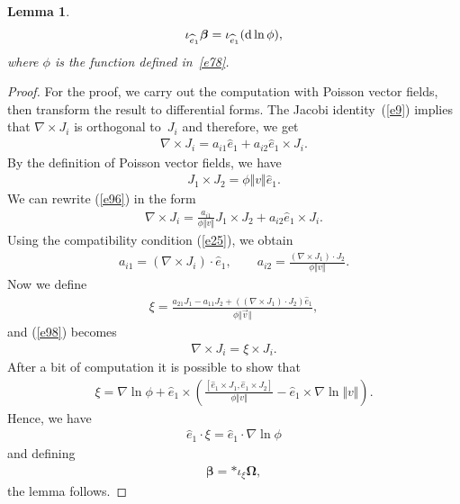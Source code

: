 \documentclass[pdftex]{sigma}
\numberwithin{equation}{section}
\newtheorem{Lemma}[Theorem]{Lemma}
\begin{document}
\begin{Lemma}\label{lemma2}
\begin{gather*}
\iota _{\widehat{e}_{1}}\boldsymbol{\beta }=\iota _{\widehat{e}_{1}} ( {\rm d}\ln \phi ),
\end{gather*}
where $\phi $ is the function defined in~\eqref{e78}.
\end{Lemma}

\begin{proof}
For the proof, we carry out the computation with Poisson vector f\/ields, then transform the result to dif\/ferential forms. The Jacobi identity~(\ref{e9}) implies that $\nabla \times J_{i}$ is orthogonal to~$J_{i}$ and therefore, we get
\begin{gather}
\nabla \times J_{i}=a_{i1}\widehat{e}_{1}+a_{i2}\widehat{e}_{1}\times J_{i}.\label{e96}
\end{gather}
By the def\/inition of Poisson vector f\/ields, we have
\begin{gather*}
J_{1}\times J_{2}=\phi \Vert v\Vert \widehat{e}_{1}.
\end{gather*}
We can rewrite (\ref{e96}) in the form
\begin{gather}
\nabla \times J_{i}=\frac{a_{i1}}{\phi \Vert v\Vert }J_{1}\times J_{2}+a_{i2}\widehat{e}_{1}\times J_{i}. \label{e98}
\end{gather}
Using the compatibility condition (\ref{e25}), we obtain
\begin{gather*}
a_{i1} = ( \nabla \times J_{i}) \cdot \widehat{e}_{1}, \qquad
a_{i2} = \frac{( \nabla \times J_{1}) \cdot J_{2}}{\phi\Vert v\Vert }.
\end{gather*}
Now we def\/ine
\begin{gather*}
\xi =\frac{a_{21}J_{1}-a_{11}J_{2}+( ( \nabla \times J_{1}) \cdot J_{2}) \widehat{e}_{1}}{\phi \Vert \overrightarrow{v}\Vert },
\end{gather*}
and (\ref{e98}) becomes
\begin{gather*}
\nabla \times J_{i}=\xi \times J_{i}.
\end{gather*}
After a bit of computation it is possible to show that
\begin{gather*}
\xi =\nabla \ln \phi +\widehat{e}_{1}\times \left( \frac{[ \widehat{e}_{1}\times J_{1},\widehat{e}_{1}\times J_{2}] }{\phi \Vert
v\Vert }-\widehat{e}_{1}\times \nabla \ln \Vert v\Vert\right).
\end{gather*}
Hence, we have
\begin{gather*}
\widehat{e}_{1}\cdot \xi =\widehat{e}_{1}\cdot \nabla \ln \phi
\end{gather*}
and def\/ining
\begin{gather*}
\boldsymbol{\beta }=\ast \iota _{\xi }\boldsymbol{\Omega},
\end{gather*}
the lemma follows.
\end{proof}
\end{document}
